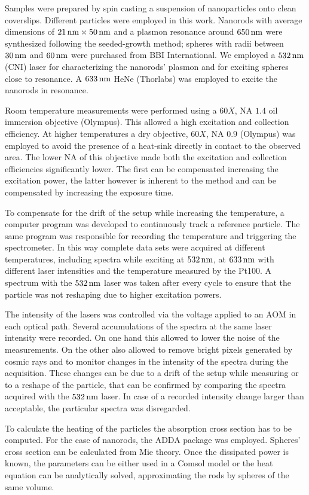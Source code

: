 Samples were prepared by spin casting a suspension of nanoparticles onto clean
coverslips. Different particles were employed in this work. Nanorods with
average dimensions of $21\,\textrm{nm}\times50\,\textrm{nm}$ and a plasmon resonance around $650\,\textrm{nm}$
were synthesized following the seeded-growth method; spheres with radii between
$30\,\textrm{nm}$ and $60\,\textrm{nm}$ were purchased from BBI International. We employed a
$532\,\textrm{nm}$ (CNI) laser for characterizing the nanorods' plasmon and for exciting
spheres close to resonance. A $633\,\textrm{nm}$ HeNe (Thorlabs) was employed to excite
the nanorods in resonance.

Room temperature measurements were performed using a $60X$, NA $1.4$ oil
immersion objective (Olympus). This allowed a high excitation and collection
efficiency. At higher temperatures a dry objective, $60X$, NA $0.9$ (Olympus)
was employed to avoid the presence of a heat-sink directly in contact to the
observed area. The lower NA of this objective made both the excitation and
collection efficiencies significantly lower. The first can be compensated
increasing the excitation power, the latter however is inherent to the method
and can be compensated by increasing the exposure time.

To compensate for the drift of the setup while increasing the temperature, a
computer program was developed to continuously track a reference particle. The
same program was responsible for recording the temperature and triggering the
spectrometer. In this way complete data sets were acquired at different
temperatures, including spectra while exciting at $532\,\textrm{nm}$, at $633\,\textrm{nm}$ with
different laser intensities and the temperature measured by the Pt100. A
spectrum with the $532\,\textrm{nm}$ laser was taken after every cycle to ensure that the
particle was not reshaping due to higher excitation powers.

The intensity of the lasers was controlled via the voltage applied to an AOM in
each optical path. Several accumulations of the spectra at the same laser
intensity were recorded. On one hand this allowed to lower the noise of the
measurements. On the other also allowed to remove bright pixels generated by
cosmic rays and to monitor changes in the intensity of the spectra during the
acquisition. These changes can be due to a drift of the setup while measuring or
to a reshape of the particle, that can be confirmed by comparing the spectra
acquired with the $532\,\textrm{nm}$ laser. In case of a recorded intensity change larger
than acceptable, the particular spectra was disregarded.

To calculate the heating of the particles the absorption cross section has to be
computed. For the case of nanorods, the ADDA package was employed. Spheres'
cross section can be calculated from Mie theory. Once the dissipated power is
known, the parameters can be either used in a Comsol model or the
heat equation can be analytically solved, approximating the rods by spheres of
the same volume.

